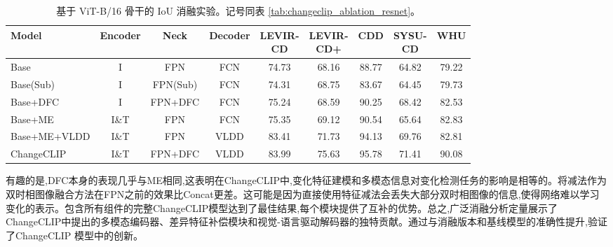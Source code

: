 \begin{table}[!htb]
\centering
\small
\setlength{\tabcolsep}{2pt}
\caption{基于 ViT-B/16 骨干的 IoU 消融实验。记号同表 \ref{tab:changeclip_ablation_resnet}。}
\label{tab:changeclip_ablation_vit}
\begin{tabular}{@{}l c c c *{5}{c}@{}}
\toprule
\textbf{Model} & \textbf{Encoder} & \textbf{Neck} & \textbf{Decoder} &
\makecell{\textbf{LEVIR-}\\\textbf{CD}} &
\makecell{\textbf{LEVIR-}\\\textbf{CD+}} &
\textbf{CDD} &
\makecell{\textbf{SYSU-}\\\textbf{CD}} &
\textbf{WHU} \\
\midrule
Base            & I     & FPN       & FCN  & 74.73 & 68.16 & 88.77 & 64.82 & 79.22 \\
Base(Sub)       & I     & FPN(Sub)  & FCN  & 74.31 & 68.75 & 83.67 & 64.45 & 79.73 \\
Base+DFC        & I     & FPN+DFC   & FCN  & 75.24 & 68.59 & 90.25 & 68.42 & 82.53 \\
Base+ME         & I\&T  & FPN       & FCN  & 75.35 & 69.12 & 90.54 & 65.64 & 82.83 \\
Base+ME+VLDD    & I\&T  & FPN       & VLDD & 83.41 & 71.73 & 94.13 & 69.76 & 82.81 \\
ChangeCLIP      & I\&T  & FPN+DFC   & VLDD & 83.99 & 75.63 & 95.78 & 71.41 & 90.08 \\
\bottomrule
\end{tabular}
\end{table}




有趣的是,DFC本身的表现几乎与ME相同,这表明在ChangeCLIP中,变化特征建模和多模态信息对变化检测任务的影响是相等的。将减法作为双时相图像融合方法在FPN之前的效果比Concat更差。这可能是因为直接使用特征减法会丢失大部分双时相图像的信息,使得网络难以学习变化的表示。包含所有组件的完整ChangeCLIP模型达到了最佳结果,每个模块提供了互补的优势。总之,广泛消融分析定量展示了ChangeCLIP中提出的多模态编码器、差异特征补偿模块和视觉-语言驱动解码器的独特贡献。通过与消融版本和基线模型的准确性提升,验证了ChangeCLIP 模型中的创新。

